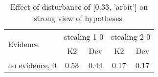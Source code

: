 \begin{table}\begin{tabular}{l|cc|cc}\toprule\multirow{2}{*}{Evidence} & \multicolumn{2}{c}{stealing 1 0}& \multicolumn{2}{c}{stealing 2 0}\\& {K2} & {Dev}& {K2} & {Dev}\\\midrule
no evidence, 0 & \cellcolor{Bittersweet}0.53&\cellcolor{Bittersweet}0.44&0.17&0.17\\\bottomrule\end{tabular}\caption{Effect of disturbance of [0.33, 'arbit'] on strong view of hypotheses.}\end{table}